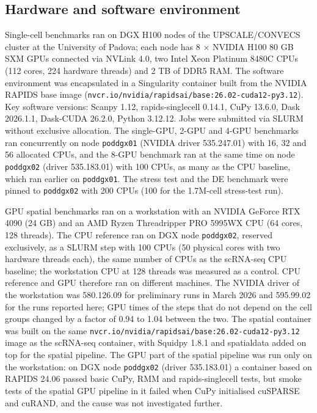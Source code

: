 \documentclass[runningheads]{llncs}
\begin{document}
\hypertarget{hardware-and-software-environment}{%
\subsection{Hardware and software environment}\label{hardware-and-software-environment}}

Single-cell benchmarks ran on DGX H100 nodes of the UPSCALE/CONVECS cluster at the University of Padova; each node has 8 $\times$ NVIDIA H100 80 GB SXM GPUs connected via NVLink 4.0, two Intel Xeon Platinum 8480C CPUs (112 cores, 224 hardware threads) and 2 TB of DDR5 RAM.
The software environment was encapsulated in a Singularity container built from the NVIDIA RAPIDS base image (\nolinkurl{nvcr.io/nvidia/rapidsai/base:26.02-cuda12-py3.12}).
Key software versions: Scanpy 1.12, rapids-singlecell 0.14.1, CuPy 13.6.0, Dask 2026.1.1, Dask-CUDA 26.2.0, Python 3.12.12.
Jobs were submitted via SLURM without exclusive allocation. The single-GPU, 2-GPU and 4-GPU benchmarks ran concurrently on node \texttt{poddgx01} (NVIDIA driver 535.247.01) with 16, 32 and 56 allocated CPUs, and the 8-GPU benchmark ran at the same time on node \texttt{poddgx02} (driver 535.183.01) with 100 CPUs, as many as the CPU baseline, which ran earlier on \texttt{poddgx01}. The stress test and the DE benchmark were pinned to \texttt{poddgx02} with 200 CPUs (100 for the 1.7M-cell stress-test run).

GPU spatial benchmarks ran on a workstation with an NVIDIA GeForce RTX 4090 (24 GB) and an AMD Ryzen Threadripper PRO 5995WX CPU (64 cores, 128 threads). The CPU reference ran on DGX node \texttt{poddgx02}, reserved exclusively, as a SLURM step with 100 CPUs (50 physical cores with two hardware threads each), the same number of CPUs as the scRNA-seq CPU baseline; the workstation CPU at 128 threads was measured as a control. CPU reference and GPU therefore ran on different machines. The NVIDIA driver of the workstation was 580.126.09 for preliminary runs in March 2026 and 595.99.02 for the runs reported here; GPU times of the steps that do not depend on the cell groups changed by a factor of 0.94 to 1.04 between the two.
The spatial container was built on the same \nolinkurl{nvcr.io/nvidia/rapidsai/base:26.02-cuda12-py3.12} image as the scRNA-seq container, with Squidpy 1.8.1 \cite{Palla2022} and spatialdata \cite{Marconato2024} added on top for the spatial pipeline.
The GPU part of the spatial pipeline was run only on the workstation: on DGX node \texttt{poddgx02} (driver 535.183.01) a container based on RAPIDS 24.06 passed basic CuPy, RMM and rapids-singlecell tests, but smoke tests of the spatial GPU pipeline in it failed when CuPy initialised cuSPARSE and cuRAND, and the cause was not investigated further.
\end{document}
